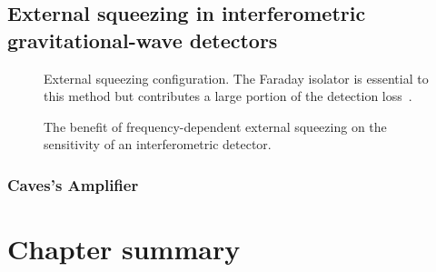



\subsection{External squeezing in interferometric gravitational-wave detectors}

\begin{figure}
	\centering
	\caption{External squeezing configuration. The Faraday isolator is essential to this method but contributes a large portion of the detection loss~\cite{}.}
	\label{fig:}
\end{figure}

\begin{figure}
	\centering
	\caption{The benefit of frequency-dependent external squeezing on the sensitivity of an interferometric detector.}
	\label{fig:}
\end{figure}








\subsubsection{Caves's Amplifier}



\section{Chapter summary}



